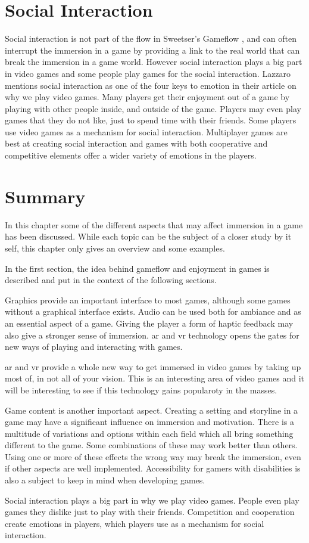 \section{Social Interaction}
Social interaction is not part of the flow in Sweetser's Gameflow \cite{sweetser2005gameflow}, and can often interrupt the immersion in a game by providing a link to the real world that can break the immersion in a game world. However social interaction plays a big part in video games and some people play games for the social interaction. Lazzaro \cite{lazzaro2004we} mentions social interaction as one of the four keys to emotion in their article on why we play video games. Many players get their enjoyment out of a game by playing with other people inside, and outside of the game. Players may even play games that they do not like, just to spend time with their friends. Some players use video games as a mechanism for social interaction. Multiplayer games are best at creating social interaction and games with both cooperative and competitive elements offer a wider variety of emotions in the players.


\section{Summary}
In this chapter some of the different aspects that may affect immersion in a game has been discussed.
While each topic can be the subject of a closer study by it self, this chapter only gives an overview and some examples.

In the first section, the idea behind gameflow and enjoyment in games is described and put in the context of the following sections.

Graphics provide an important interface to most games, although some games without a graphical interface exists.
Audio can be used both for ambiance and as an essential aspect of a game.
Giving the player a form of haptic feedback may also give a stronger sense of immersion.
\gls{ar} and \gls{vr} technology opens the gates for new ways of playing and interacting with games.

\gls{ar} and \gls{vr} provide a whole new way to get immersed in video games by taking up most of, in not all of your vision. This is an interesting area of video games and it will be interesting to see if this technology gains popularoty in the masses.

Game content is another important aspect.
Creating a setting and storyline in a game may have a significant influence on immersion and motivation.
There is a multitude of variations and options within each field which all bring something different to the game.
Some combinations of these may work better than others.
Using one or more of these effects the wrong way may break the immersion, even if other aspects are well implemented.
Accessibility for gamers with disabilities is also a subject to keep in mind when developing games.

Social interaction plays a big part in why we play video games. People even play games they dislike just to play with their friends. Competition and cooperation create emotions in players, which players use as a mechanism for social interaction.
